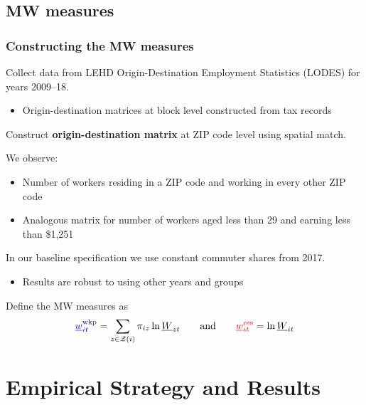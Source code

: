 \documentclass[aspectratio=169, t]{beamer}
\newcommand{\Z}{\mathcal{Z}}
\newcommand{\MW}{\underline{W}}
\newcommand{\mw}{\underline{w}}
\newcommand{\wkp}{\text{wkp}}
\newcommand{\res}{\text{res}}
\begin{document}
\subsection{MW measures}

\begin{frame}
    \frametitle{Constructing the MW measures}
        
    Collect data from LEHD Origin-Destination Employment Statistics (LODES) for years 2009--18.
    \begin{itemize}
        \item Origin-destination matrices at block level constructed from tax records
    \end{itemize}

    \vspace{1mm}
    Construct \textbf{origin-destination matrix} at ZIP code level using spatial match.
    
    \pause
    \vspace{2mm}
    We observe:
    \begin{itemize} \small
        \item Number of workers residing in a ZIP code and working in every other ZIP code
        \item Analogous matrix for number of workers aged less than 29 and earning less than 
        \$1,251
    \end{itemize}
    
    \vspace{1mm}
    In our baseline specification we use constant commuter shares from 2017.
    \begin{itemize} \small
        \item Results are robust to using other years and groups
    \end{itemize}

    \pause
    \vspace{4mm}
    Define the MW measures as
    $$
    {\color{blue} \mw^{\wkp}_{it}} = \sum_{z \in \Z(i)} \pi_{i z} \ln \MW_{zt}
    \quad\quad\text{and}\quad\quad
    {\color{red} \mw^{\res}_{it}} = \ln \MW_{it}
    $$
\end{frame}

\section{Empirical Strategy and Results}
\end{document}
